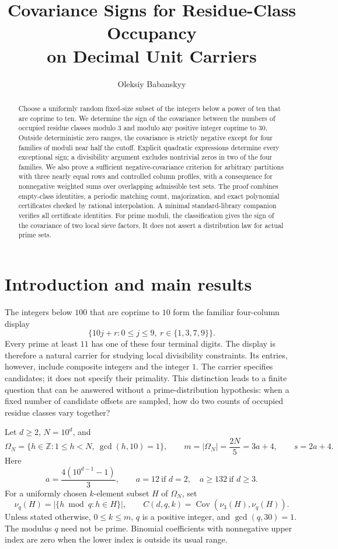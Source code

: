 \documentclass[11pt,a4paper]{article}
\title{Covariance Signs for Residue-Class Occupancy\\on Decimal Unit Carriers}
\author{Oleksiy Babanskyy}
\date{}
\theoremstyle{remark}
\DeclareMathOperator{\Cov}{Cov}
\numberwithin{equation}{section}
\begin{document}
\maketitle
\begin{abstract}
Choose a uniformly random fixed-size subset of the integers below a power
of ten that are coprime to ten. We determine the sign of the covariance
between the numbers of occupied residue classes modulo \(3\) and modulo
any positive integer coprime to \(30\). Outside deterministic zero ranges,
the covariance is strictly negative except for four families of moduli
near half the cutoff. Explicit quadratic expressions determine every
exceptional sign; a divisibility argument excludes nontrivial zeros in
two of the four families. We also prove a sufficient
negative-covariance criterion for arbitrary partitions with three nearly
equal rows and controlled column profiles, with a consequence for
nonnegative weighted sums over overlapping admissible test sets.
The proof combines empty-class
identities, a periodic matching count, majorization, and exact polynomial
certificates checked by rational interpolation. A minimal standard-library
companion verifies all certificate identities. For prime moduli, the
classification gives the sign of the covariance of two local sieve
factors. It does not assert a distribution law for actual prime sets.
\end{abstract}

\section{Introduction and main results}\label{sec:intro}

The integers below \(100\) that are coprime to \(10\) form the familiar
four-column display
\[
 \{10j+r:0\le j\le9,\ r\in\{1,3,7,9\}\}.
\]
Every prime at least \(11\) has one of these four terminal digits.
The display is therefore a natural carrier for studying local divisibility
constraints. Its entries, however, include composite integers and the
integer \(1\). The carrier specifies candidates; it does not specify their
primality. This distinction leads to a finite question that can be answered
without a prime-distribution hypothesis: when a fixed number of candidate
offsets are sampled, how do two counts of occupied residue classes vary
together?

Let \(d\ge2\), \(N=10^d\), and
\begin{equation}\label{eq:carrier}
 \Omega_N=\{h\in\mathbb Z:1\le h<N,\ \gcd(h,10)=1\},\qquad
 m=|\Omega_N|=\frac{2N}{5}=3a+4,\qquad s=2a+4.
\end{equation}
Here
\[
 a=\frac{4(10^{d-1}-1)}3,
 \qquad a=12\ \text{if }d=2,\quad a\ge132\ \text{if }d\ge3.
\]
For a uniformly chosen \(k\)-element subset \(H\) of \(\Omega_N\), set
\[
 \nu_q(H)=|\{h\bmod q:h\in H\}|,\qquad
 C(d,q,k)=\Cov(\nu_3(H),\nu_q(H)).
\]
Unless stated otherwise, \(0\le k\le m\), \(q\) is a positive integer,
and \(\gcd(q,30)=1\). The modulus \(q\) need not be prime.
Binomial coefficients with nonnegative upper index are zero when the
lower index is outside its usual range.
\end{document}
